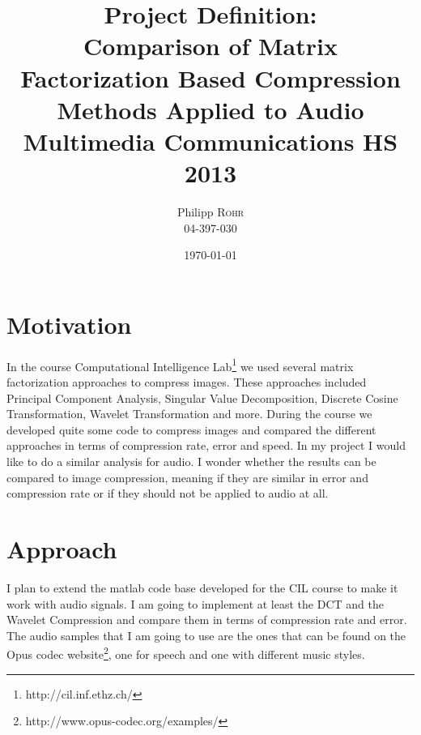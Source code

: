 \documentclass[a4paper]{article}
\title{Project Definition: \\ Comparison of Matrix Factorization Based
Compression Methods Applied to Audio\\ Multimedia Communications HS 2013} %
\author{Philipp \textsc{Rohr} \\ 04-397-030} %
\date{\today} %
\begin{document}
\maketitle %



\section{Motivation}

In the course Computational Intelligence Lab\footnote{http://cil.inf.ethz.ch/}
we used several matrix factorization approaches to compress images. These
approaches included Principal Component Analysis, Singular Value Decomposition,
Discrete Cosine Transformation, Wavelet Transformation and more. During the
course we developed quite some code to compress images and compared the
different approaches in terms of compression rate, error and speed. In my
project I would like to do a similar analysis for audio. I wonder whether the
results can be compared to image compression, meaning if they are similar in
error and compression rate or if they should not be applied to audio at all.


\section{Approach} I plan to extend the matlab code base developed for the CIL
course to make it work with audio signals. I am going to implement at least the
DCT and the Wavelet Compression and compare them in terms of compression rate
and error. The audio samples that I am going to use are the ones that can be
found on the Opus codec website\footnote{http://www.opus-codec.org/examples/},
one for speech and one with different music styles.


\end{document}
